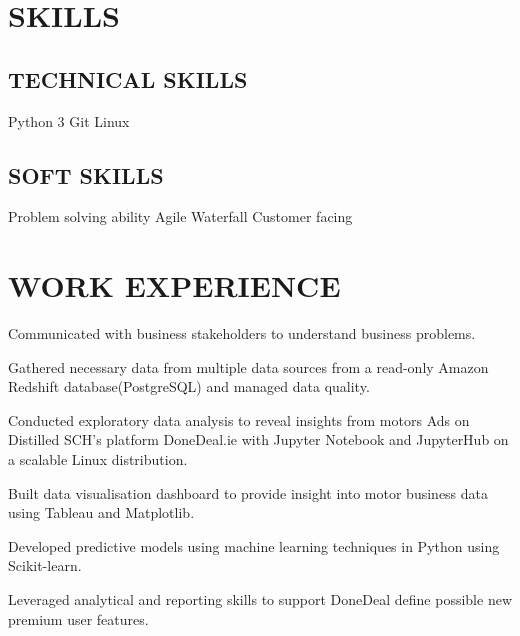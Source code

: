 \documentclass[]{ben-resume-openfont}
\begin{document}
\begin{minipage}[t]{0.61\textwidth} 


\section{SKILLS} 
\subsection{TECHNICAL SKILLS}
Python 3 \textbullet Git \textbullet Linux 
\subsection{SOFT SKILLS}
Problem solving ability \textbullet Agile \textbullet Waterfall \textbullet Customer facing


\section{WORK EXPERIENCE}
\vspace{\topsep}
\begin{tightemize}
\item Communicated with business stakeholders to understand business problems.

\item Gathered necessary data from multiple data sources from a read-only Amazon Redshift database(PostgreSQL) and managed data quality.

\item Conducted exploratory data analysis to reveal insights from motors Ads on Distilled SCH's platform DoneDeal.ie with Jupyter Notebook and JupyterHub on a scalable Linux distribution.

\item Built data visualisation dashboard to provide insight into motor business data using Tableau and Matplotlib.

\item Developed predictive models using machine learning techniques in Python using Scikit-learn.

\item Leveraged analytical and reporting skills to support DoneDeal define possible new premium user features.
\end{tightemize}
\sectionsep


\end{minipage}
\end{document}
